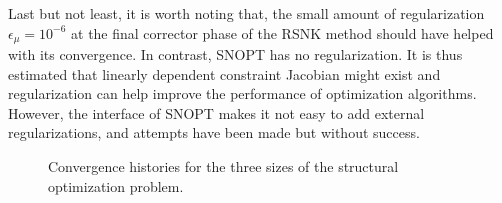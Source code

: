 Last but not least, it is worth noting that, the small amount of regularization $\epsilon_{\mu}=10^{-6}$  
at the final corrector phase of the RSNK method should have helped with its convergence. In contrast, SNOPT 
has no regularization. It is thus estimated that linearly dependent constraint Jacobian might exist and regularization 
can help improve the performance of optimization algorithms. However, 
the interface of SNOPT makes it not easy to add external regularizations, and attempts have been made 
but without success.    

\begin{figure}[tbp]
  \centering
  \hspace{1em}
  \hspace{1em}
    \caption{Convergence histories for the three sizes of the structural
      optimization problem. \label{fig:struct2}}
\end{figure}

